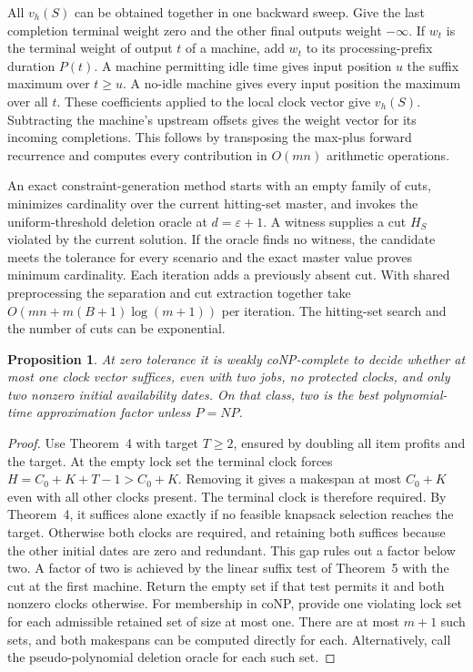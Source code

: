 \documentclass[11pt,letterpaper]{article}
\newtheorem{proposition}[theorem]{Proposition}
\begin{document}
All $v_h(S)$ can be obtained together in one backward sweep. Give the last completion terminal weight zero and the other final outputs weight $-\infty$. If $w_t$ is the terminal weight of output $t$ of a machine, add $w_t$ to its processing-prefix duration $P(t)$. A machine permitting idle time gives input position $u$ the suffix maximum over $t\ge u$. A no-idle machine gives every input position the maximum over all $t$. These coefficients applied to the local clock vector give $v_h(S)$. Subtracting the machine's upstream offsets gives the weight vector for its incoming completions. This follows by transposing the max-plus forward recurrence and computes every contribution in $O(mn)$ arithmetic operations.

An exact constraint-generation method starts with an empty family of cuts, minimizes cardinality over the current hitting-set master, and invokes the uniform-threshold deletion oracle at $d=\varepsilon+1$. A witness supplies a cut $H_S$ violated by the current solution. If the oracle finds no witness, the candidate meets the tolerance for every scenario and the exact master value proves minimum cardinality. Each iteration adds a previously absent cut. With shared preprocessing the separation and cut extraction together take $O(mn+m(B+1)\log(m+1))$ per iteration. The hitting-set search and the number of cuts can be exponential.

\begin{proposition}
\label{prop:retention_gap}
At zero tolerance it is weakly coNP-complete to decide whether at most one clock vector suffices, even with two jobs, no protected clocks, and only two nonzero initial availability dates. On that class, two is the best polynomial-time approximation factor unless $P=NP$.
\end{proposition}

\begin{proof}
Use Theorem~4 with target $T\ge 2$, ensured by doubling all item profits and the target. At the empty lock set the terminal clock forces $H=C_0+K+T-1>C_0+K$. Removing it gives a makespan at most $C_0+K$ even with all other clocks present. The terminal clock is therefore required. By Theorem~4, it suffices alone exactly if no feasible knapsack selection reaches the target. Otherwise both clocks are required, and retaining both suffices because the other initial dates are zero and redundant. This gap rules out a factor below two. A factor of two is achieved by the linear suffix test of Theorem~5 with the cut at the first machine. Return the empty set if that test permits it and both nonzero clocks otherwise. For membership in coNP, provide one violating lock set for each admissible retained set of size at most one. There are at most $m+1$ such sets, and both makespans can be computed directly for each. Alternatively, call the pseudo-polynomial deletion oracle for each such set.
\end{proof}
\end{document}
